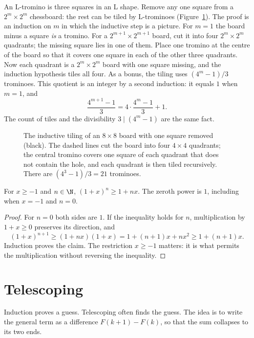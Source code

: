 \begin{examplex}
An L-tromino is three squares in an L shape. Remove any one square from a $2^m\times2^m$ chessboard: the rest can be tiled by L-trominoes
(Figure~\ref{fig:tromino}). The proof is an induction on $m$ in which the inductive step is a picture. For $m=1$ the board minus a square \emph{is}
a tromino. For a $2^{m+1}\times2^{m+1}$ board, cut it into four $2^m\times2^m$ quadrants; the missing square lies in one of them. Place one tromino
at the centre of the board so that it covers one square in each of the other three quadrants. Now each quadrant is a $2^m\times2^m$ board with one
square missing, and the induction hypothesis tiles all four. As a bonus, the tiling uses $(4^m-1)/3$ trominoes. This quotient is an integer by a second induction: it equals $1$ when $m=1$, and
\[
\frac{4^{m+1}-1}3=4\cdot\frac{4^m-1}3+1.
\]
The count of tiles and the divisibility $3\mid(4^m-1)$ are the same fact.
\end{examplex}

\begin{figure}[ht]
\centering
{}
\caption{The inductive tiling of an $8\times8$ board with one square removed (black). The dashed lines cut the board into four $4\times4$ quadrants; the central tromino covers one square of each quadrant that does not contain the hole, and each quadrant is then tiled recursively. There are $(4^3-1)/3=21$ trominoes.}
\label{fig:tromino}
\end{figure}

\begin{proposition}\label{prop:bernoulli}
For $x\ge-1$ and $n\in\N$, $(1+x)^n\ge1+nx$. The zeroth power is $1$, including when $x=-1$ and $n=0$.
\end{proposition}
\begin{proof}
For $n=0$ both sides are $1$. If the inequality holds for $n$, multiplication by $1+x\ge0$ preserves its direction, and
\[
(1+x)^{n+1}\ge(1+nx)(1+x)=1+(n+1)x+nx^2\ge1+(n+1)x.
\]
Induction proves the claim. The restriction $x\ge-1$ matters: it is what permits the multiplication without reversing the inequality.
\end{proof}

\section{Telescoping}

Induction proves a guess. Telescoping often finds the guess. The idea is to write the general term as a difference $F(k+1)-F(k)$, so that the sum collapses to its two ends.

